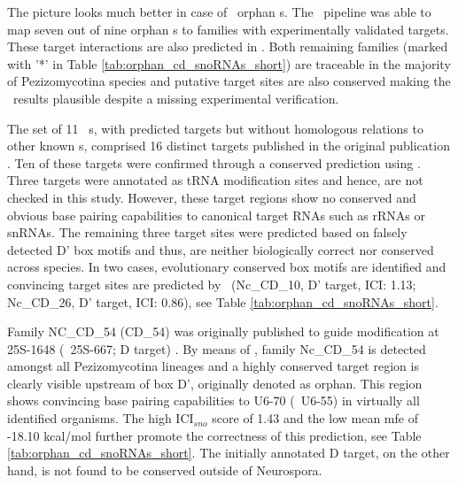 The picture looks much better in case of \afu\ orphan \sno s. The
\snostrip\ pipeline was able to map seven out of nine orphan \cd s to
families with experimentally validated targets. These target
interactions are also predicted in \afu. Both remaining families
(marked with '*' in Table \ref{tab:orphan_cd_snoRNAs_short}) are
traceable in the majority of Pezizomycotina species and putative
target sites are also conserved making the \snostrip\ results
plausible despite a missing experimental verification.

The set of 11 \ncr\ \sno s, with predicted targets but without
homologous relations to other known \sno s, comprised 16 distinct
targets published in the original publication \cite{Li:2005}.  Ten of
these targets were confirmed through a conserved prediction using
\snostrip.  Three targets were annotated as tRNA modification sites
and hence, are not checked in this study. However, these target
regions show no conserved and obvious base pairing capabilities to
canonical target RNAs such as rRNAs or snRNAs. The remaining three
target sites were predicted based on falsely detected D' box motifs
and thus, are neither biologically correct nor conserved across
species. In two cases, evolutionary conserved box motifs are
identified and convincing target sites are predicted by \snostrip\
(Nc\_CD\_10, D' target, ICI: 1.13; Nc\_CD\_26, D' target, ICI: 0.86),
see Table \ref{tab:orphan_cd_snoRNAs_short}.

Family NC\_CD\_54 (CD\_54) was originally published to guide
modification at 25S-1648 (\ncr\ 25S-667; D target) \cite{Liu:2009}. By
means of \snostrip, family Nc\_CD\_54 is detected amongst all
Pezizomycotina lineages and a highly conserved target region is
clearly visible upstream of box D', originally denoted as orphan. This
region shows convincing base pairing capabilities to U6-70 (\ncr\
U6-55) in virtually all identified organisms. The high ICI$_{sno}$
score of 1.43 and the low mean mfe of -18.10 kcal/mol further promote
the correctness of this prediction, see Table
\ref{tab:orphan_cd_snoRNAs_short}. The initially annotated D target,
on the other hand, is not found to be conserved outside of Neurospora.

